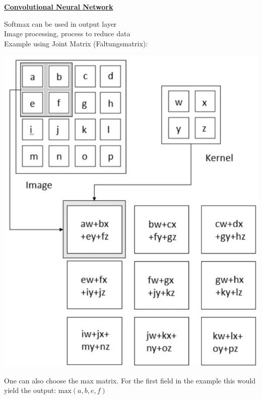         {\centering \underline{\textbf{Convolutional Neural Network}} \par}
    	Softmax can be used in output layer\\
        Image processing, process to reduce data\\
        Example using Joint Matrix (Faltungsmatrix):
        {\centering \includegraphics[width = 0.8\linewidth]{src/8_ml/images/convolutional.png} \par}
        One can also choose the max matrix. For the first field in the example this would yield the output: $\text{max}(a, b, e, f)$